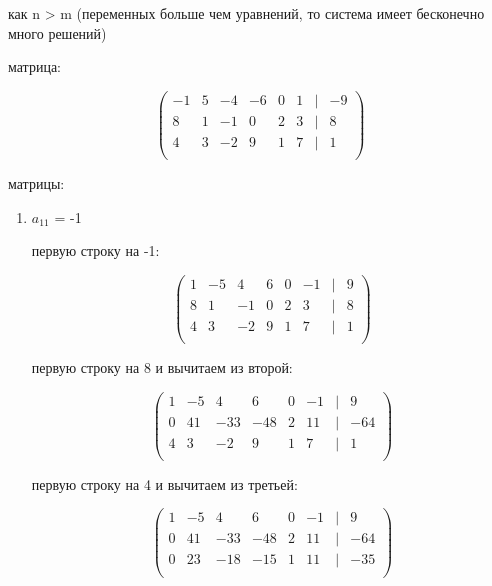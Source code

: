 \documentclass{report}
\begin{document}
	\begin{itemize}
		
		 как n > m (переменных больше чем уравнений, то система имеет бесконечно много решений)
		
		 матрица:
		
		\begin{center}
			{
				\[
				\begin{pmatrix}
					-1 & 5 & -4 & -6 & 0 & 1 & | & -9 \\
					8 & 1 & -1 & 0 & 2 & 3 & | & 8 \\
					4 & 3 & -2 & 9 & 1 & 7 & | & 1 \\
				\end{pmatrix}
				\]
			}
		\end{center}
		
		 матрицы:
		
		\begin{enumerate}
			\item{$a_{11}$ = -1}
			
			\begin{itemize}
				 первую строку на -1:
				
				\begin{center}
					{
						\[
						\begin{pmatrix}
							1 & -5 & 4 & 6 & 0 & -1 & | & 9 \\
							8 & 1 & -1 & 0 & 2 & 3 & | & 8 \\
							4 & 3 & -2 & 9 & 1 & 7 & | & 1 \\
						\end{pmatrix}
						\]
					}
				\end{center}
				
				 первую строку на 8 и вычитаем из второй:
				
				\begin{center}
					{
						\[
						\begin{pmatrix}
							1 & -5 & 4 & 6 & 0 & -1 & | & 9 \\
							0 & 41 & -33 & -48 & 2 & 11 & | & -64 \\
							4 & 3 & -2 & 9 & 1 & 7 & | & 1 \\
						\end{pmatrix}
						\]
					}
				\end{center}
				
				 первую строку на 4 и вычитаем из третьей:
				
				\begin{center}
					{
						\[
						\begin{pmatrix}
							1 & -5 & 4 & 6 & 0 & -1 & | & 9 \\
							0 & 41 & -33 & -48 & 2 & 11 & | & -64 \\
							0 & 23 & -18 & -15 & 1 & 11 & | & -35 \\
						\end{pmatrix}
						\]
					}
				\end{center}
				

\end{itemize}
\end{enumerate}
\end{itemize}
\end{document}
